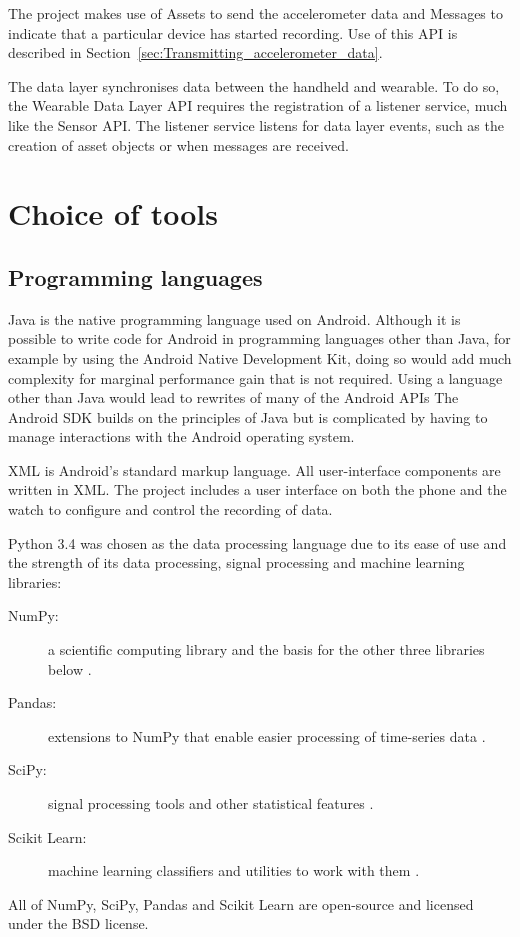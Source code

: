      The project makes use of Assets to send the accelerometer data and Messages to indicate that a particular device has started recording. Use of this API is described in Section~\ref{sec:Transmitting_accelerometer_data}.
      
      The data layer synchronises data between the handheld and wearable. To do so, the Wearable Data Layer API requires the registration of a listener service, much like the Sensor API. The listener service listens for data layer events, such as the creation of asset objects or when messages are received.      
      
  \section{Choice of tools}
    \subsection{Programming languages}
      \label{sec:programming_languages}
      Java is the native programming language used on Android. Although it is
      possible to write code for Android in programming languages other than Java, for example 
      by using the Android Native Development Kit, doing so would add much complexity for marginal performance gain that is not required. Using a language other than Java would lead to rewrites of many of the Android APIs The Android SDK builds on the principles of Java but is complicated by having to manage interactions with the Android operating system.
      
      XML is Android's standard markup language. All user-interface components are written in XML.
      The project includes a user interface on both the phone and the watch to configure and control the recording of data.
      
      Python 3.4 was chosen as the data processing language due to its ease of use and the strength of its data processing, signal processing and machine learning libraries:
      \begin{description}
        \item[NumPy:] a scientific computing library and the basis for the other three libraries below \cite{van2011numpy}.
        \item[Pandas:] extensions to NumPy that enable easier processing of time-series data \cite{pandas}.
        \item[SciPy:] signal processing tools and other statistical features \cite{scipy}.
        \item[Scikit Learn:] machine learning classifiers and utilities to work with them \cite{scikitlearn}.
      \end{description}
      All of NumPy, SciPy, Pandas and Scikit Learn are open-source and licensed under the BSD license.
